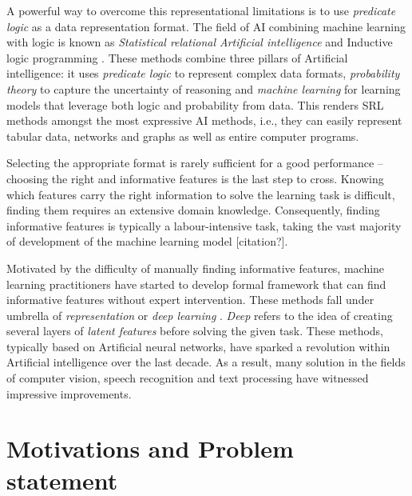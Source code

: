A powerful way to overcome this representational limitations is to use \textit{predicate logic} as a data representation format. 
The field of AI combining machine learning with logic is known as \textit{Statistical relational Artificial intelligence} \cite{GetoorSRL,Raedt:2016:SRA:3027718} and Inductive logic programming \cite{LucRLbook}.
These methods combine three pillars of Artificial intelligence: it uses \textit{predicate logic} to represent complex data formats, \textit{probability theory} to capture the uncertainty of reasoning and \textit{machine learning} for learning models that leverage both logic and probability from data.
This renders SRL methods amongst the most expressive AI methods, i.e., they can easily represent tabular data, networks and graphs as well as entire computer programs. 



Selecting the appropriate format is rarely sufficient for a good performance -- choosing the right and informative features is the last step to cross.
Knowing which features carry the right information to solve the learning task is difficult, finding them requires an extensive domain knowledge. 
Consequently, finding informative features is typically a labour-intensive task, taking the vast majority of development of the machine learning model [citation?].



Motivated by the difficulty of manually finding informative features, machine learning practitioners have started to develop formal framework that can find informative features without expert intervention.
These methods fall under umbrella of \textit{representation} or \textit{deep learning} \cite{Goodfellow2016, Bengio:2009}.
\textit{Deep} refers to the idea of creating several layers of \textit{latent features} before solving the given task.
These methods, typically based on Artificial neural networks, have sparked a revolution within Artificial intelligence over the last decade.
As a result, many solution in the fields of computer vision, speech recognition and text processing have witnessed impressive improvements.










\section{Motivations and Problem statement}

